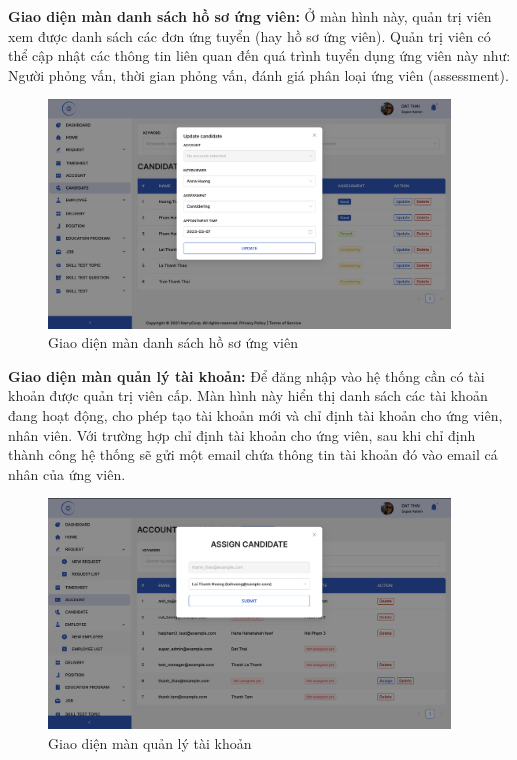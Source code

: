 \documentclass[../DoAn.tex]{subfiles}
\begin{document}
\textbf{Giao diện màn danh sách hồ sơ ứng viên:}
Ở màn hình này, quản trị viên xem được danh sách các đơn ứng tuyển (hay hồ sơ ứng viên). Quản trị viên có thể cập nhật các thông tin liên quan đến quá trình tuyển dụng ứng viên này như: Người phỏng vấn, thời gian phỏng vấn, đánh giá phân loại ứng viên (assessment).
\begin{figure}[H]
    \centering
    \includegraphics[width=0.95\textwidth]{Hinhve/QuanLyUngVien.png}
    \caption{Giao diện màn danh sách hồ sơ ứng viên}
\end{figure}

\textbf{Giao diện màn quản lý tài khoản:}
Để đăng nhập vào hệ thống cần có tài khoản được quản trị viên cấp. Màn hình này hiển thị danh sách các tài khoản đang hoạt động, cho phép tạo tài khoản mới và chỉ định tài khoản cho ứng viên, nhân viên. Với trường hợp chỉ định tài khoản cho ứng viên, sau khi chỉ định thành công hệ thống sẽ gửi một email chứa thông tin tài khoản đó vào email cá nhân của ứng viên.
\begin{figure}[H]
    \centering
    \includegraphics[width=0.95\textwidth]{Hinhve/QuanLyTaiKhoan.png}
    \caption{Giao diện màn quản lý tài khoản}
\end{figure}
\end{document}
